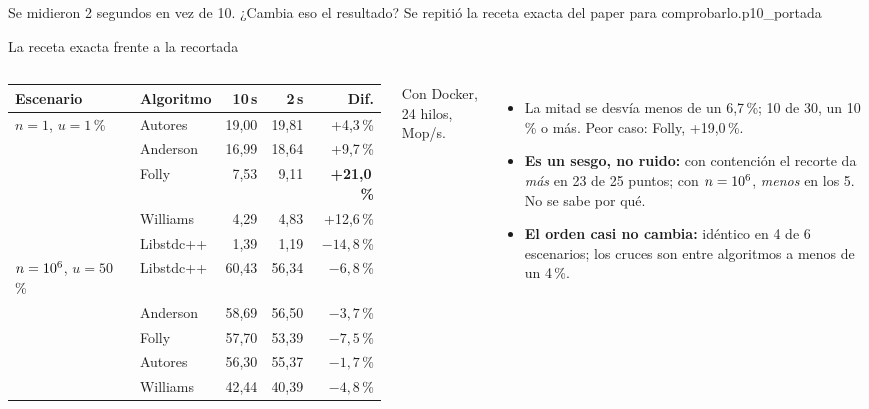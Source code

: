   {Se midieron 2 segundos en vez de 10. ¿Cambia eso el resultado? Se repitió la receta exacta del paper para comprobarlo.}{p10_portada}

\begin{frame}{La receta exacta frente a la recortada}
  \begin{columns}[T]
    \scriptsize\renewcommand{\arraystretch}{1.05}
    \begin{tabular}{@{}llrrr@{}}
      \toprule
      \textbf{Escenario} & \textbf{Algoritmo} & \textbf{10\,s\por7} & \textbf{2\,s\por5} & \textbf{Dif.}\\
      \midrule
      $n = 1$, $u = 1$\,\% & Autores & 19,00 & 19,81 & +4,3\,\%\\
      & Anderson & 16,99 & 18,64 & +9,7\,\%\\
      & Folly & 7,53 & 9,11 & \textbf{+21,0\,\%}\\
      & Williams & 4,29 & 4,83 & +12,6\,\%\\
      & Libstdc++ & 1,39 & 1,19 & $-14,8$\,\%\\
      \midrule
      $n = 10\textsuperscript{6}$, $u = 50$\,\% & Libstdc++ & 60,43 & 56,34 & $-6,8$\,\%\\
      & Anderson & 58,69 & 56,50 & $-3,7$\,\%\\
      & Folly & 57,70 & 53,39 & $-7,5$\,\%\\
      & Autores & 56,30 & 55,37 & $-1,7$\,\%\\
      & Williams & 42,44 & 40,39 & $-4,8$\,\%\\
      \bottomrule
    \end{tabular}
    \par\smallskip\scriptsize Con Docker, 24 hilos, Mop/s.
    \begin{itemize}\footnotesize\setlength{\itemsep}{3pt}
      \item La mitad se desvía menos de un 6,7\,\%; 10 de 30, un 10\,\% o más. Peor caso: Folly, +19,0\,\%.
      \item \textbf{Es un sesgo, no ruido:} con contención el recorte da \emph{más} en 23 de 25 puntos; con $n = 10\textsuperscript{6}$, \emph{menos} en los 5. No se sabe por qué.
      \item \textbf{El orden casi no cambia:} idéntico en 4 de 6 escenarios; los cruces son entre algoritmos a menos de un 4\,\%.
    \end{itemize}
  \end{columns}
  \vfill
\end{frame}
